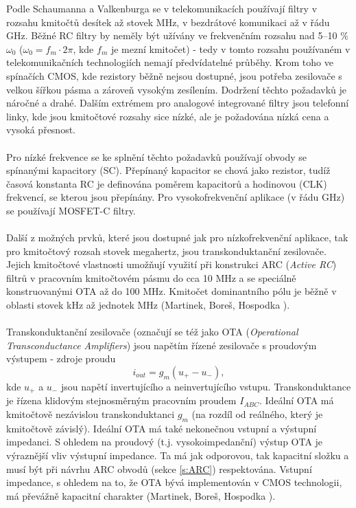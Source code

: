 Podle Schaumanna a Valkenburga \cite{18} se v telekomunikacích používají filtry v rozsahu kmitočtů desítek až stovek MHz, v bezdrátové komunikaci až v řádu GHz. Běžné RC filtry by neměly být užívány ve frekvenčním rozsahu nad 5--10 $\%$ $\omega _0$ ($\omega _0 = f_m \cdot 2 \pi$, kde $f_m$ je mezní kmitočet) - tedy v tomto rozsahu používaném v telekomunikačních technologiích nemají předvídatelné průběhy. Krom toho ve spínačích CMOS, kde rezistory běžně nejsou dostupné, jsou potřeba zesilovače s velkou šířkou pásma a zároveň vysokým zesílením. Dodržení těchto požadavků je náročné a drahé. Dalším extrémem pro analogové integrované filtry jsou telefonní linky, kde jsou kmitočtové rozsahy sice nízké, ale je požadována nízká cena a vysoká přesnost.\\
\\
Pro nízké frekvence se ke splnění těchto požadavků používají obvody se spínanými kapacitory (SC). Přepínaný kapacitor se chová jako rezistor, tudíž časová konstanta RC je definována poměrem kapacitorů a hodinovou (CLK) frekvencí, se kterou jsou přepínány. Pro vysokofrekvenční aplikace (v řádu GHz) se používají MOSFET-C filtry.\\
\\
Další z možných prvků, které jsou dostupné jak pro nízkofrekvenční aplikace, tak pro kmitočtový rozsah stovek megahertz, jsou transkonduktanční zesilovače. Jejich kmitočtové vlastnosti umožňují využití při konstrukci ARC (\textit{Active RC}) filtrů v pracovním kmitočtovém pásmu do cca 10 MHz a se speciálně konstruovanými OTA až do 100 MHz. Kmitočet dominantního pólu je běžně v oblasti stovek kHz až jednotek MHz (Martinek, Boreš, Hospodka \cite{10}).\\
\\
Transkonduktanční zesilovače (označují se též jako OTA (\textit{Operational Transconductance Amplifiers}) jsou napětím řízené zesilovače s proudovým výstupem - zdroje proudu
\begin{equation}
i_{out} = g_m(u_+ - u_-),
\end{equation}
kde $u_+$ a $u_-$ jsou napětí invertujícího a neinvertujícího vstupu. Transkonduktance je řízena klidovým stejnosměrným pracovním proudem $I_{ABC}$. Ideální OTA má kmitočtově nezávislou transkonduktanci $g_m$ (na rozdíl od reálného, který je kmitočtově závislý). Ideální OTA má také nekonečnou vstupní a výstupní impedanci. S ohledem na proudový (t.j. vysokoimpedanční) výstup OTA je výraznější vliv výstupní impedance. Ta má jak odporovou, tak kapacitní složku a musí být při návrhu ARC obvodů (sekce \ref{s:ARC}) respektována. Vstupní impedance, s ohledem na to, že OTA bývá implementován v CMOS technologii, má převážně kapacitní charakter (Martinek, Boreš, Hospodka \cite{10}).
